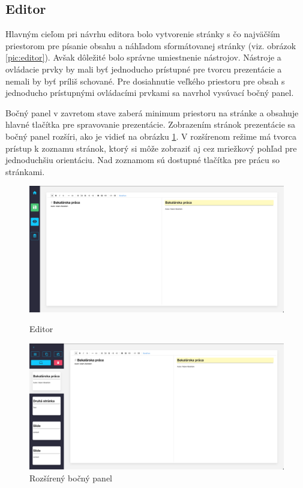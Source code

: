 \subsection*{Editor}
Hlavným cieľom pri návrhu editora bolo vytvorenie stránky s čo najväčším priestorom pre písanie obsahu a náhľadom sformátovanej stránky (viz. obrázok \ref{pic:editor}). Avšak dôležité bolo správne umiestnenie nástrojov. Nástroje a ovládacie prvky by mali byť jednoducho prístupné pre tvorcu prezentácie a nemali by byť príliš schované. Pre dosiahnutie veľkého priestoru pre obsah s jednoducho prístupnými ovládacími prvkami sa navrhol vysúvací bočný panel.

Bočný panel v zavretom stave zaberá minimum priestoru na stránke a obsahuje hlavné tlačítka pre spravovanie prezentácie. Zobrazením stránok prezentácie sa bočný panel rozšíri, ako je vidieť na obrázku \ref{pic:bocny_panel}. V rozšírenom režime má tvorca prístup k zoznamu stránok, ktorý si môže zobraziť aj cez mriežkový pohľad pre jednoduchšiu orientáciu. Nad zoznamom sú dostupné tlačítka pre prácu so stránkami.

\begin{figure}[!hbt]
\centering
\begin{minipage}{.5\textwidth}
  \centering
  \includegraphics[scale=0.11]{obrazky/editor.png}
  \caption{Editor}
  \label{pic:editor}
\end{minipage}%
\begin{minipage}{.5\textwidth}
  \centering
  \includegraphics[scale=0.11]{obrazky/bocny_panel.png}
  \caption{Rozšírený bočný panel}
  \label{pic:bocny_panel}
\end{minipage}
\end{figure}

